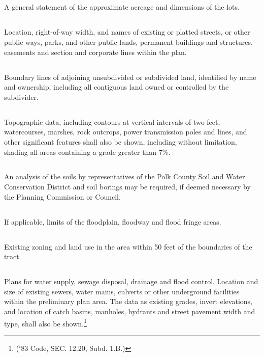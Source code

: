 \subsection{}
A general statement of the approximate acreage and dimensions of the lots.
\subsection{}
Location, right-of-way width, and names of existing or platted streets, or other public ways, parks, and other public lands, permanent buildings and structures, easements and section and corporate lines within the plan.
\subsection{}
Boundary lines of adjoining unsubdivided or subdivided land, identified by name and ownership, including all contiguous land owned or controlled by the subdivider.
\subsection{}
Topographic data, including contours at vertical intervals of two feet, watercourses, marshes, rock outcrops, power transmission poles and lines, and other significant features shall also be shown, including without limitation, shading all areas containing a grade greater than 7\%.
\subsection{}
An analysis of the soils by representatives of the Polk County Soil and Water Conservation District and soil borings may be required, if deemed necessary by the Planning Commission or Council.
\subsection{}
If applicable, limits of the floodplain, floodway and flood fringe areas.
\subsection{}
Existing zoning and land use in the area within 50 feet of the boundaries of the tract.
\subsection{}
Plans for water supply, sewage disposal, drainage and flood control.  Location and size of existing sewers, water mains, culverts or other underground facilities within the preliminary plan area.  The data as existing grades, invert elevations, and location of catch basins, manholes, hydrants and street pavement width and type, shall also be shown.\footnote{(‘83 Code, SEC. 12.20, Subd. 1.B.)}

